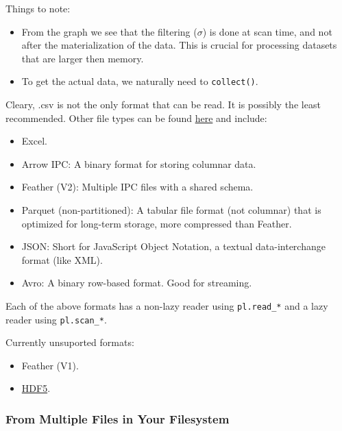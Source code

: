 \documentclass[
  letterpaper,
  DIV=11,
  numbers=noendperiod]{scrartcl}
\providecommand{\tightlist}{%
  \setlength{\itemsep}{0pt}\setlength{\parskip}{0pt}}\usepackage{longtable,booktabs,array}
\begin{document}
Things to note:

\begin{itemize}
\tightlist
\item
  From the graph we see that the filtering (\(\sigma\)) is done at scan
  time, and not after the materialization of the data. This is crucial
  for processing datasets that are larger then memory.
\item
  To get the actual data, we naturally need to \texttt{collect()}.
\end{itemize}

Cleary, .csv is not the only format that can be read. It is possibly the
least recommended. Other file types can be found
\href{https://pola-rs.github.io/polars/py-polars/html/reference/io.html}{here}
and include:

\begin{itemize}
\tightlist
\item
  Excel.
\item
  Arrow IPC: A binary format for storing columnar data.
\item
  Feather (V2): Multiple IPC files with a shared schema.
\item
  Parquet (non-partitioned): A tabular file format (not columnar) that
  is optimized for long-term storage, more compressed than Feather.
\item
  JSON: Short for JavaScript Object Notation, a textual data-interchange
  format (like XML).
\item
  Avro: A binary row-based format. Good for streaming.
\end{itemize}

Each of the above formats has a non-lazy reader using
\texttt{pl.read\_*} and a lazy reader using \texttt{pl.scan\_*}.

Currently unsuported formats:

\begin{itemize}
\tightlist
\item
  Feather (V1).
\item
  \href{https://github.com/pola-rs/polars/issues/3520}{HDF5}.
\end{itemize}

\hypertarget{from-multiple-files-in-your-filesystem}{%
\subsubsection{From Multiple Files in Your
Filesystem}\label{from-multiple-files-in-your-filesystem}}
\end{document}
